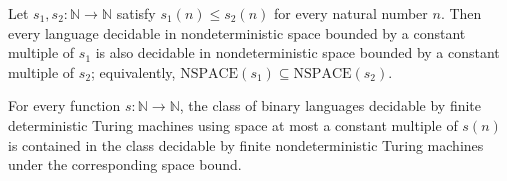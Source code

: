 \begin{theorem}
\label{Complexity.NSPACE.mono}
\leanok
{}
Let $s_1,s_2:\mathbb{N}\to\mathbb{N}$ satisfy $s_1(n)\le s_2(n)$ for every natural
number $n$. Then every language decidable in nondeterministic space bounded by a
constant multiple of $s_1$ is also decidable in nondeterministic space bounded by a
constant multiple of $s_2$; equivalently,
$\mathrm{NSPACE}(s_1)\subseteq\mathrm{NSPACE}(s_2)$.
\end{theorem}

\begin{theorem}
\label{Complexity.SPACE_subset_NSPACE}
\leanok
{}
For every function $s : \mathbb{N} \to \mathbb{N}$, the class of binary languages
decidable by finite deterministic Turing machines using space at most a constant
multiple of $s(n)$ is contained in the class decidable by finite nondeterministic Turing
machines under the corresponding space bound.
\end{theorem}
